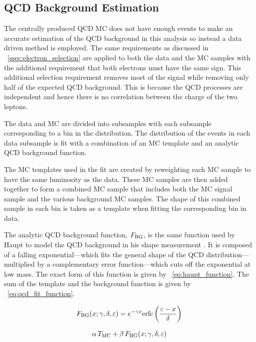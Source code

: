\subsection{QCD Background Estimation}


The centrally produced QCD MC does not have enough events to make an accurate
estimation of the QCD background in this analysis so instead a data driven
method is employed. The same requirements as discussed in
\SEC~\ref{ssec:electron_selection} are applied to both the data and the MC
samples with the additional requirement that both electrons must have the same
sign. This additional selection requirement removes most of the signal while
removing only half of the expected QCD background. This is because the QCD
processes are independent and hence there is no correlation between the charge
of the two leptons.

The data and MC are divided into subsamples with each subsample corresponding
to a bin in the \phistar distribution. The \mee distribution of the events in
each data subsample is fit with a combination of an MC template and an analytic
QCD background function.

The MC templates used in the fit are created by reweighting each MC sample to
have the same luminosity as the data. These MC samples are then added together to
form a combined MC sample that includes both the MC \MADGRAPH signal sample and
the various background MC samples. The shape of this combined sample in each
\phistar bin is taken as a template when fitting the corresponding bin in data.

The analytic QCD background function, $F_{\text{BG}}$, is the same function used by
Haupt to model the QCD background in his \Ztoee shape measurement
\cite{haupt_2011}. It is composed of a falling exponential---which fits the
general shape of the QCD distribution---multiplied by a complementary error
function---which cuts off the exponential at low mass. The exact form of this
function is given by \EQ~\ref{eq:haupt_function}. The sum of the template and
the background function is given by \EQ~\ref{eq:qcd_fit_function}.

\begin{equation}\label{eq:haupt_function}
    F_{\text{BG}}(x; \gamma, \delta, \varepsilon) = e^{- \gamma x} {\mathrm{erfc}} \left( \frac{\varepsilon - x}{\delta} \right)
\end{equation}

\begin{equation}\label{eq:qcd_fit_function}
    \alpha \, T_{\text{MC}} + \beta \, F_{\text{BG}}(x; \gamma, \delta, \varepsilon)
\end{equation}


